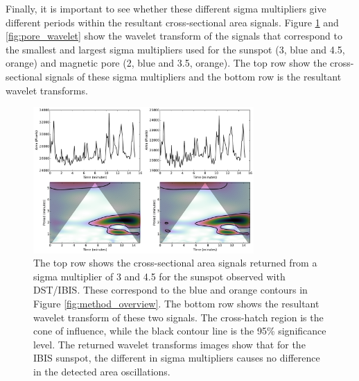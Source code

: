     Finally, it is important to see whether these different sigma multipliers give different periods within the resultant cross-sectional area signals.
    Figure \ref{fig:sunspot_wavelet} and \ref{fig:pore_wavelet} show the wavelet transform of the signals that correspond to the smallest and largest sigma multipliers used for the sunspot (3, blue and 4.5, orange) and magnetic pore (2, blue and 3.5, orange).
    The top row show the cross-sectional signals of these sigma multipliers and the bottom row is the resultant wavelet transforms.

    \begin{figure}
        \centering
        \includegraphics[width=0.75\textwidth]{sunspot_wavelet.pdf}
        \caption{
            The top row shows the cross-sectional area signals returned from a sigma multiplier of 3 and 4.5 for the sunspot observed with DST/IBIS.
            These correspond to the blue and orange contours in Figure \ref{fig:method_overview}.
            The bottom row shows the resultant wavelet transform of these two signals.
            The cross-hatch region is the cone of influence, while the black contour line is the 95\% significance level.
            The returned wavelet transforms images show that for the IBIS sunspot, the different in sigma multipliers causes no difference in the detected area oscillations.
        }
        \label{fig:sunspot_wavelet}
    \end{figure}
    
